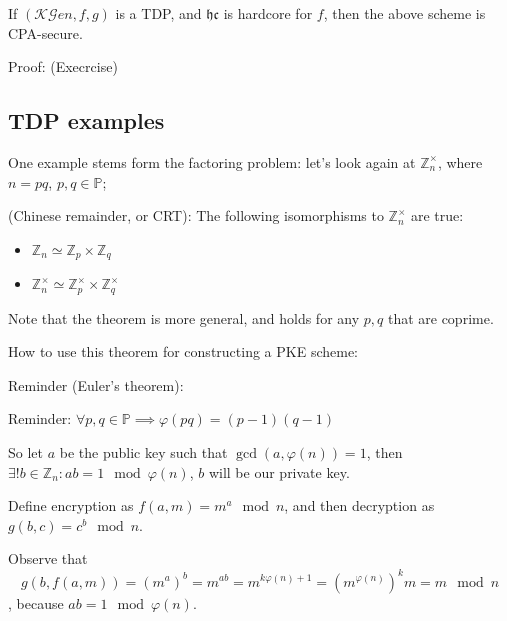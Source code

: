 \begin{theorem}
    If $(\mathcal{KG}en, f, g)$ is a TDP, and $\mathfrak{hc}$ is hardcore for $f$, then the above scheme is CPA-secure.    
\end{theorem}

Proof: (Execrcise)

\subsection{TDP examples}

One example stems form the factoring problem: let's look again at $\mathbb{Z}_n^\times$, where $n = pq$, $p, q \in \mathbb{P}$;

\begin{theorem}
    (Chinese remainder, or CRT): The following isomorphisms to $\mathbb{Z}_n^\times$ are true:

\begin{itemize}
    \item $\mathbb{Z}_n \simeq \mathbb{Z}_p \times \mathbb{Z}_q$
        \item $\mathbb{Z}_n^\times \simeq \mathbb{Z}_p^\times \times \mathbb{Z}_q^\times$
\end{itemize}

Note that the theorem is more general, and holds for any $p, q$ that are coprime.
\end{theorem}

How to use this theorem for constructing a PKE scheme:

Reminder (Euler's theorem):

Reminder: $\forall p, q \in \mathbb{P} \implies \varphi(pq) = (p-1)(q-1)$

So let $a$ be the public key such that $\gcd(a, \varphi(n))=1$, then $\exists! b
\in \mathbb{Z}_n : ab = 1 \mod \varphi(n)$, $b$ will be our private key.

Define encryption as $f(a, m) = m^a \mod n$, and then decryption as $g(b, c) =
c^b \mod n$.

Observe that 
\[
g(b, f(a, m)) = (m^a)^b =m^{ab}=m^{k\varphi(n)+1}=(m^{\varphi(n)})^{k}m = m \mod n
\]
, because $ab = 1 \mod \varphi(n)$.

